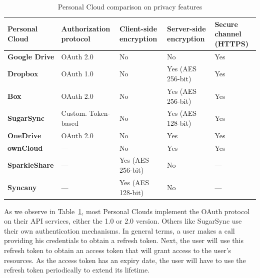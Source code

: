 {
\def\arraystretch{1.5}

\begin{table}
\begin{center}
    \begin{tabular}{ | p{3.3cm} | p{2.5cm} | p{2.2cm} | p{2.2cm} | p{2cm} | }
    \hline
    \rowcolor[gray]{0.8}

	\textbf{Personal Cloud} &
	\textbf{Authorization protocol} &
	\textbf{Client-side encryption} &
	\textbf{Server-side encryption} & 
	\textbf{Secure channel (HTTPS)} \\ \hline
	
	\textbf{Google Drive} &
	OAuth 2.0 &
	No &
	No &
	Yes \\ \hline

	\textbf{Dropbox} &
	OAuth 1.0 &
	No &
	Yes (AES 256-bit) &
	Yes \\ \hline
	
	\textbf{Box} &
	OAuth 2.0 &
	No &
	Yes (AES 256-bit) &
	Yes \\ \hline
	
	\textbf{SugarSync} & 
	Custom. Token-based &
	No &
	Yes (AES 128-bit) &
	Yes \\ \hline
	
	\textbf{OneDrive} & 
	OAuth 2.0 &
	No &
	Yes &
	Yes \\ \hline

	\textbf{ownCloud} &
	--- &
	No &
	Yes &
	Yes \\ \hline
	
	\textbf{SparkleShare} &
	--- &
	Yes (AES 256-bit) &
	No &
	--- \\ \hline
	
	\textbf{Syncany} &
	--- &
	Yes (AES 128-bit) &
	No &
	--- \\ \hline

    \end{tabular}
    \caption{Personal Cloud comparison on privacy features}
    \label{tab:pc_privacy}
\end{center}
\end{table}
}

As we observe in Table~\ref{tab:pc_privacy}, most Personal Clouds implement the OAuth protocol on their API services, either the 1.0 or 2.0 version. Others like SugarSync use their own authentication mechanisms. In general terms, a user makes a call providing his credentials to obtain a refresh token. Next, the user will use this refresh token to obtain an access token that will grant access to the user's resources. As the access token has an expiry date, the user will have to use the refresh token periodically to extend its lifetime.

